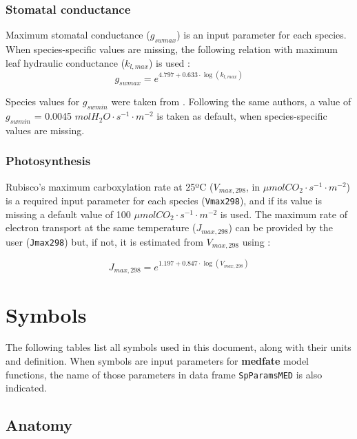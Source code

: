 \documentclass[]{book}
\begin{document}
\hypertarget{stomatal-conductance}{%
\subsection{Stomatal conductance}\label{stomatal-conductance}}

Maximum stomatal conductance (\(g_{swmax}\)) is an input parameter for each species. When species-specific values are missing, the following relation with maximum leaf hydraulic conductance (\(k_{l, max}\)) is used \citep{Mencuccini2003}:
\begin{equation}
g_{swmax} = e^{4.797 + 0.633\cdot \log(k_{l, max})}
\end{equation}

Species values for \(g_{swmin}\) were taken from \citet{Duursma2018}. Following the same authors, a value of \(g_{swmin}\) = 0.0045 \(mol H_2O \cdot s^{-1} \cdot m^{-2}\) is taken as default, when species-specific values are missing.

\hypertarget{photosynthesis}{%
\subsection{Photosynthesis}\label{photosynthesis}}

Rubisco's maximum carboxylation rate at 25ºC (\(V_{max, 298}\), in \(\mu mol CO_2 \cdot s^{-1} \cdot m^{-2}\)) is a required input parameter for each species (\texttt{Vmax298}), and if its value is missing a default value of 100 \(\mu mol CO_2 \cdot s^{-1} \cdot m^{-2}\) is used. The maximum rate of electron transport at the same temperature (\(J_{max, 298}\)) can be provided by the user (\texttt{Jmax298}) but, if not, it is estimated from \(V_{max, 298}\) using \citet{Walker2014}:

\begin{equation}
J_{max, 298} = e^{1.197 + 0.847\cdot \log(V_{max,298})}
\end{equation}

\hypertarget{symbols}{%
\chapter{Symbols}\label{symbols}}

The following tables list all symbols used in this document, along with their units and definition. When symbols are input parameters for \textbf{medfate} model functions, the name of those parameters in data frame \texttt{SpParamsMED} is also indicated.

\hypertarget{anatomy}{%
\section{Anatomy}\label{anatomy}}
\end{document}
